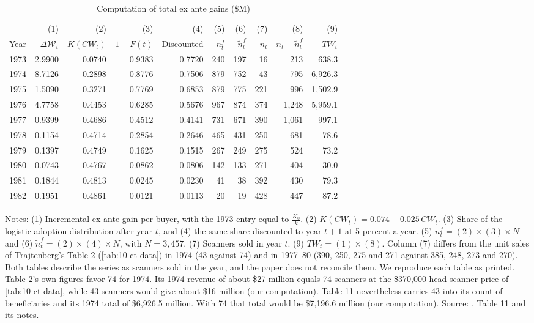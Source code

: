 \begin{table}[htbp]
\centering
\caption{Computation of total ex ante gains (\$M)}
\label{tab:10-ct-total}
\small
\begin{tabular}{@{}lrrrrrrrrr@{}}
\toprule
& (1) & (2) & (3) & (4) & (5) & (6) & (7) & (8) & (9) \\
Year & $\Delta\mathcal{W}_t$ & $K(CW_t)$ & $1 - F(t)$ & Discounted & $n^f_t$ & $\tilde n^f_t$ & $n_t$ &
  $n_t + \tilde n^f_t$ & $TW_t$ \\
\midrule
1973 & 2.9900 & 0.0740 & 0.9383 & 0.7720 & 240 & 197 & 16 & 213 & 638.3 \\
1974 & 8.7126 & 0.2898 & 0.8776 & 0.7506 & 879 & 752 & 43 & 795 & 6,926.3 \\
1975 & 1.5090 & 0.3271 & 0.7769 & 0.6853 & 879 & 775 & 221 & 996 & 1,502.9 \\
1976 & 4.7758 & 0.4453 & 0.6285 & 0.5676 & 967 & 874 & 374 & 1,248 & 5,959.1 \\
1977 & 0.9399 & 0.4686 & 0.4512 & 0.4141 & 731 & 671 & 390 & 1,061 & 997.1 \\
1978 & 0.1154 & 0.4714 & 0.2854 & 0.2646 & 465 & 431 & 250 & 681 & 78.6 \\
1979 & 0.1397 & 0.4749 & 0.1625 & 0.1515 & 267 & 249 & 275 & 524 & 73.2 \\
1980 & 0.0743 & 0.4767 & 0.0862 & 0.0806 & 142 & 133 & 271 & 404 & 30.0 \\
1981 & 0.1844 & 0.4813 & 0.0245 & 0.0230 & 41 & 38 & 392 & 430 & 79.3 \\
1982 & 0.1951 & 0.4861 & 0.0121 & 0.0113 & 20 & 19 & 428 & 447 & 87.2 \\
\bottomrule
\end{tabular}

\smallskip
\begin{minipage}{0.94\linewidth}
\footnotesize Notes: (1) Incremental ex ante gain per buyer, with the 1973 entry equal to $\frac{K_0}{k}$. (2)
$K(CW_t) = 0.074 + 0.025\,CW_t$. (3) Share of the logistic adoption distribution after year $t$, and (4) the same
share discounted to year $t+1$ at 5 percent a year. (5) $n^f_t = (2)\times(3)\times N$ and (6) $\tilde n^f_t =
(2)\times(4)\times N$, with $N = 3{,}457$. (7) Scanners sold in year $t$. (9) $TW_t = (1)\times(8)$. Column (7)
differs from the unit sales of Trajtenberg's Table 2 (\cref{tab:10-ct-data}) in 1974 (43 against 74) and in 1977--80
(390, 250, 275 and 271 against 385, 248, 273 and 270). Both tables describe the series as scanners sold in the year,
and the paper does not reconcile them. We reproduce each table as printed. Table 2's own figures favor 74 for 1974.
Its 1974 revenue of about \$27 million equals 74 scanners at the \$370,000 head-scanner price of
\cref{tab:10-ct-data}, while 43 scanners would give about \$16 million (our computation). Table 11 nevertheless
carries 43 into its count of beneficiaries and its 1974 total of \$6,926.5 million. With 74 that total would be
\$7,196.6 million (our computation). Source: \citet{Trajtenberg1985}, Table 11 and its notes.
\end{minipage}
\end{table}

